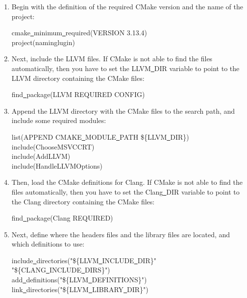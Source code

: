 \begin{enumerate}
\item Begin with the definition of the required CMake version and the name of the project:
\begin{tcolorbox}[colback=white,colframe=black]
cmake\underline{~}minimum\underline{~}required(VERSION 3.13.4) \\
project(naminglugin)
\end{tcolorbox}

\item Next, include the LLVM files. If CMake is not able to find the files automatically, then you have to set the LLVM\underline{~}DIR variable to point to the LLVM directory containing the CMake files:
\begin{tcolorbox}[colback=white,colframe=black]
find\underline{~}package(LLVM REQUIRED CONFIG)
\end{tcolorbox}

\item Append the LLVM directory with the CMake files to the search path, and include some required modules:
\begin{tcolorbox}[colback=white,colframe=black]
list(APPEND CMAKE\underline{~}MODULE\underline{~}PATH \$\{LLVM\underline{~}DIR\}) \\ 
include(ChooseMSVCCRT) \\
include(AddLLVM) \\
include(HandleLLVMOptions)
\end{tcolorbox}

\item Then, load the CMake definitions for Clang. If CMake is not able to find the files automatically, then you have to set the Clang\underline{~}DIR variable to point to the Clang directory containing the CMake files:
\begin{tcolorbox}[colback=white,colframe=black]
find\underline{~}package(Clang REQUIRED)
\end{tcolorbox}

\item Next, define where the headers files and the library files are located, and which definitions to use:
\begin{tcolorbox}[colback=white,colframe=black]
include\underline{~}directories("\$\{LLVM\underline{~}INCLUDE\underline{~}DIR\}" \\
\hspace*{1cm}"\$\{CLANG\underline{~}INCLUDE\underline{~}DIRS\}") \\
add\underline{~}definitions("\$\{LLVM\underline{~}DEFINITIONS\}") \\
link\underline{~}directories("\$\{LLVM\underline{~}LIBRARY\underline{~}DIR\}")
\end{tcolorbox}


\end{enumerate}
